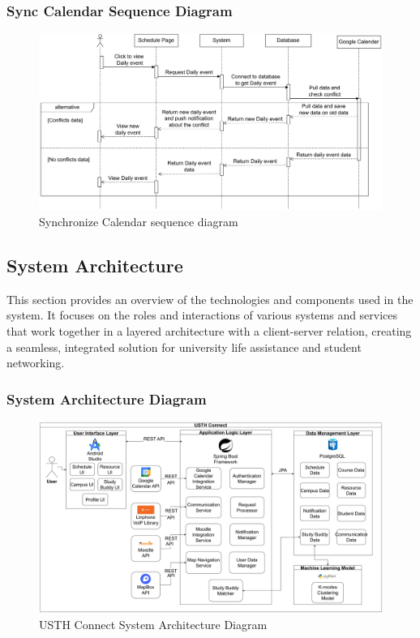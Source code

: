 \documentclass[12pt]{article}
\begin{document}
\subsubsection{Sync Calendar Sequence Diagram}

    \begin{figure}[H]
        \centering
        \includegraphics[width=1\textwidth]{image/SyncCalendar.pdf} 
        \caption{Synchronize Calendar sequence diagram}
        \label{fig:sync_calendar_sequence}
    \end{figure}




\subsection{System Architecture}
This section provides an overview of the technologies and components used in the system.
It focuses on the roles and interactions of various systems and services that work together in a layered architecture with a client-server relation, creating a seamless, integrated solution for university life assistance and student networking.

\subsubsection{System Architecture Diagram}
\begin{figure}[H]
    \centering
    \includegraphics[width=\textwidth]{image/System_Architecture_USTH_Connect.pdf} 
    \caption{USTH Connect System Architecture Diagram}
\end{figure}
\end{document}
